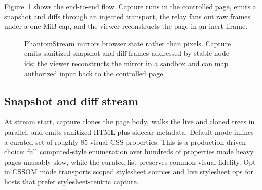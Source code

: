 \documentclass[conference]{IEEEtran}
\begin{document}
Figure~\ref{fig:arch} shows the end-to-end flow. Capture runs in the controlled
page, emits a snapshot and diffs through an injected transport, the relay fans
out raw frames under a one MiB cap, and the viewer reconstructs the page in an
inert iframe.

\begin{figure}[t]
\centering
{}
\caption{PhantomStream mirrors browser state rather than pixels. Capture emits
sanitized snapshot and diff frames addressed by stable node ids; the viewer
reconstructs the mirror in a sandbox and can map authorized input back to the
controlled page.}
\label{fig:arch}
\end{figure}

\subsection{Snapshot and diff stream}

At stream start, capture clones the page body, walks the live and cloned trees in
parallel, and emits sanitized HTML plus sidecar metadata. Default mode inlines a
curated set of roughly 85 visual CSS properties. This is a production-driven
choice: full computed-style enumeration over hundreds of properties made heavy
pages unusably slow, while the curated list preserves common visual fidelity.
Opt-in CSSOM mode transports scoped stylesheet sources and live stylesheet ops
for hosts that prefer stylesheet-centric capture.
\end{document}
